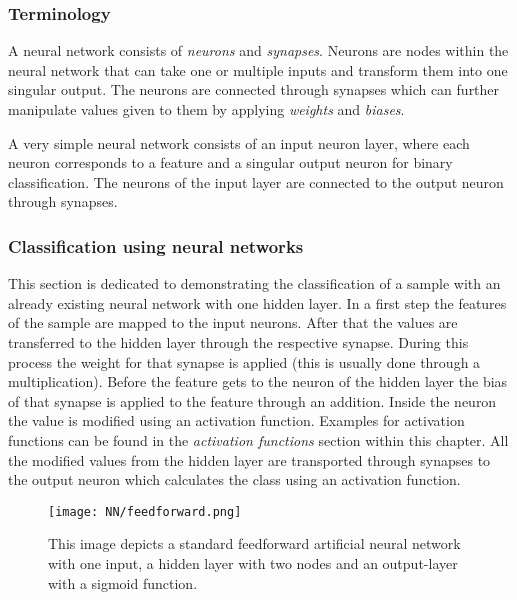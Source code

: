 \subsubsection*{Terminology}
A neural network consists of \textit{neurons} and \textit{synapses}. 
Neurons are nodes within the neural network that can take one or multiple inputs and transform them into one singular output.
The neurons are connected through synapses which can further manipulate values given to them by applying \textit{weights} and \textit{biases}\cite[]{Schmidhuber2015}.

A very simple neural network consists of an input neuron layer, where each neuron corresponds to a feature and a singular output neuron for binary classification. 
The neurons of the input layer are connected to the output neuron through synapses.

\subsubsection*{Classification using neural networks}
This section is dedicated to demonstrating the classification of a sample with an already existing neural network with one hidden layer.
In a first step the features of the sample are mapped to the input neurons. After that the values are transferred to the hidden layer through the respective 
synapse. During this process the weight for that synapse is applied (this is usually done through a multiplication). Before the feature gets to the neuron of the hidden layer 
the bias of that synapse is applied to the feature through an addition. Inside the neuron the value is modified using an activation function. Examples for activation functions can be found 
in the \textit{activation functions} section within this chapter. All the modified values from the hidden layer are transported through synapses to the output neuron 
which calculates the class using an activation function\cite[]{Schmidhuber2015}.
\begin{figure}[H]
    \begin{center}
        \captionsetup{justification=centering}
        \caption[]{
        This image depicts a standard feedforward artificial neural network with one input, a hidden layer with two nodes and an output-layer 
        with a sigmoid function.}
        \label{fig:nn_rep}
        \texttt{[image: NN/feedforward.png]}
    \end{center}
\end{figure}

